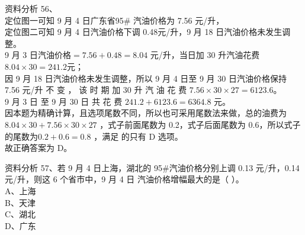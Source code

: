 \documentclass[aspectratio=169]{beamer}
\begin{document}
\begin{frame}[t]{资料分析}
    56、\\
    定位图一可知 9 月 4 日广东省95\# 汽油价格为 7.56 元/升，\\
    定位图二可知 9 月 4 日汽油价格下调 0.48元/升，9 月 18 日汽油价格未发生调整。\\
    9 月 3 日汽油价格$=7.56+0.48=8.04$  元/升，当日加 30 升汽油花费 $8.04 \times 30=241.2 元$；\\
    因 9 月 18 日汽油价格未发生调整，所以 9 月 4 日至 9 月 30 日汽油价格保持 7.56 元/升 不 变 ，
    该 时 期 加 30 升 汽 油 花 费 $7.56 \times 30 \times 27 = 6123.6$。\\
    9 月 3 日 至 9 月 30 日 共 花 费 $241.2 +6123.6 =6364.8$ 元。\\
    因本题为精确计算，且选项尾数不同，所以也可采用尾数法来做，总的油费为 $8.04 \times 30 + 7.56 \times 30 \times 27$
    ，式子前面尾数为 0.2，式子后面尾数为 0.6，所以式子的尾数为$0.2+0.6 = 0.8$ ，满足
    的只有 D 选项。\\
    故正确答案为 D。
\end{frame}                           










\begin{frame}[t]{资料分析}
    57、若 9 月 4 日上海，湖北的 95\#汽油价格分别上调 0.13 元/升，0.14 元/升，则这 6 个省市中，9 月 4 日
    汽油价格增幅最大的是（ ）。\\
    A、上海                    \\
    B、天津                    \\
    C、湖北                    \\
    D、广东                    \\
\end{frame}                           
\end{document}
